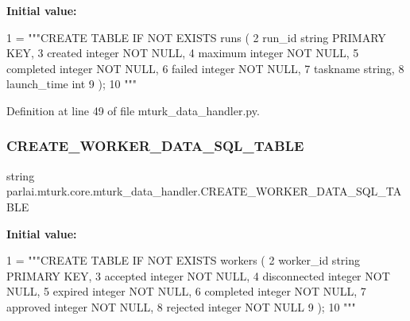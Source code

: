 {\bfseries Initial value\+:}
\begin{DoxyCode}
1 =  \textcolor{stringliteral}{"""CREATE TABLE IF NOT EXISTS runs (}
2 \textcolor{stringliteral}{        run\_id string PRIMARY KEY,}
3 \textcolor{stringliteral}{        created integer NOT NULL,}
4 \textcolor{stringliteral}{        maximum integer NOT NULL,}
5 \textcolor{stringliteral}{        completed integer NOT NULL,}
6 \textcolor{stringliteral}{        failed integer NOT NULL,}
7 \textcolor{stringliteral}{        taskname string,}
8 \textcolor{stringliteral}{        launch\_time int}
9 \textcolor{stringliteral}{    );}
10 \textcolor{stringliteral}{    """}
\end{DoxyCode}


Definition at line 49 of file mturk\+\_\+data\+\_\+handler.\+py.

\mbox{\label{namespaceparlai_1_1mturk_1_1core_1_1mturk__data__handler_a9cc89230a62225a6345d560bf37b5449}} 
\subsubsection{\texorpdfstring{C\+R\+E\+A\+T\+E\+\_\+\+W\+O\+R\+K\+E\+R\+\_\+\+D\+A\+T\+A\+\_\+\+S\+Q\+L\+\_\+\+T\+A\+B\+LE}{CREATE\_WORKER\_DATA\_SQL\_TABLE}}
{\footnotesize\ttfamily string parlai.\+mturk.\+core.\+mturk\+\_\+data\+\_\+handler.\+C\+R\+E\+A\+T\+E\+\_\+\+W\+O\+R\+K\+E\+R\+\_\+\+D\+A\+T\+A\+\_\+\+S\+Q\+L\+\_\+\+T\+A\+B\+LE}

{\bfseries Initial value\+:}
\begin{DoxyCode}
1 =  \textcolor{stringliteral}{"""CREATE TABLE IF NOT EXISTS workers (}
2 \textcolor{stringliteral}{        worker\_id string PRIMARY KEY,}
3 \textcolor{stringliteral}{        accepted integer NOT NULL,}
4 \textcolor{stringliteral}{        disconnected integer NOT NULL,}
5 \textcolor{stringliteral}{        expired integer NOT NULL,}
6 \textcolor{stringliteral}{        completed integer NOT NULL,}
7 \textcolor{stringliteral}{        approved integer NOT NULL,}
8 \textcolor{stringliteral}{        rejected integer NOT NULL}
9 \textcolor{stringliteral}{    );}
10 \textcolor{stringliteral}{    """}
\end{DoxyCode}


